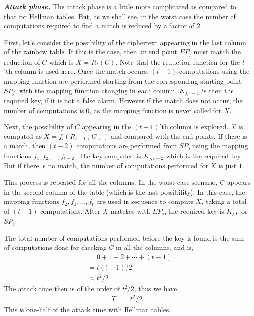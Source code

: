 \noindent \textit{\textbf{Attack phase.}} The attack phase is a little more complicated as compared to that for Hellman tables. But, as we shall see, in the worst case the number of computations required to find a match is reduced by a factor of $2$. 

First, let's consider the possibility of the ciphertext appearing in the last column of the rainbow table. If this is the case, then an end point $EP_j$ must match the reduction of $C$ which is $X$ = $R_t(C)$. Note that the reduction function for the $t$'th column is used here. Once the match occurs, $(t-1)$ computations using the mapping function are performed starting from the corresponding starting point $SP_j$, with the mapping function changing in each column. $K_{j,t-1}$ is then the required key, if it is not a false alarm. However if the match does not occur, the number of computations is 0, as the mapping function is never called for $X$.

Next, the possibility of $C$ appearing in the $(t-1)$'th column is explored. $X$ is computed as $X = f_{t}(R_{t-1}(C))$ and compared with the end points. If there is a match, then $(t-2)$ computations are performed from $SP_{j}$ using the mapping functions $f_1, f_2, \ldots, f_{t-2}$. The key computed is $K_{j,t-2}$ which is the required key. But if there is no match, the number of computations performed for $X$ is just $1$.

This process is repeated for all the columns. In the worst case scenario, $C$ appears in the second column of the table (which is the last possibility). In this case, the mapping functions $f_2, f_3, \ldots, f_t$ are used in sequence to compute $X$, taking a total of $(t-1)$ computations. After $X$ matches with $EP_j$, the required key is $K_{j,0}$ or $SP_j$. 

The total number of computations performed before the key is found is the sum of computations done for checking $C$ in all the columns, and is,
\begin{align*}
&= 0 + 1 + 2 + \cdots + (t-1)\\
&= t(t-1)/2\\
&\approx t^2/2
\end{align*}
The attack time then is of the order of $t^2/2$, thus we have,
\begin{align}
\label{eq:time-rainbow-single-prefix} T &= t^2/2
\end{align}
This is one-half of the attack time with Hellman tables.\\

